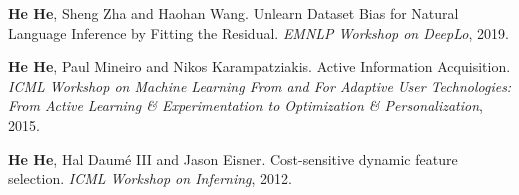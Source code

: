 \textbf{He He}, Sheng Zha and Haohan Wang. Unlearn Dataset Bias for Natural Language Inference by Fitting the Residual. \textit{EMNLP Workshop on DeepLo}, 2019.

\textbf{He He}, Paul Mineiro and Nikos Karampatziakis. Active Information Acquisition. \textit{ICML Workshop on Machine Learning From and For Adaptive User Technologies: From Active Learning \& Experimentation to Optimization \& Personalization}, 2015.

\textbf{He He}, Hal Daum\'e III and Jason Eisner. Cost-sensitive dynamic feature selection. \textit{ICML Workshop on Inferning}, 2012.

